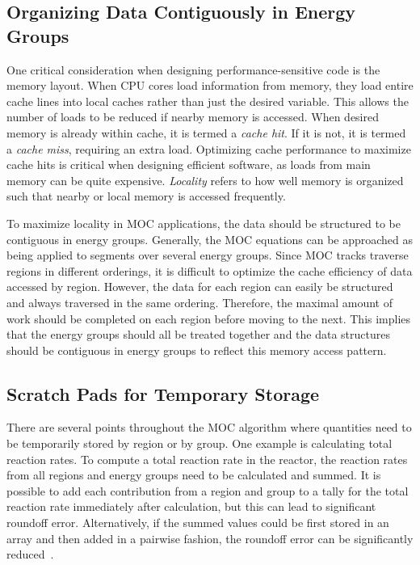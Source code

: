 \subsection{Organizing Data Contiguously in Energy Groups}

One critical consideration when designing performance-sensitive code is the memory layout. When CPU cores load information from memory, they load entire cache lines into local caches rather than just the desired variable. This allows the number of loads to be reduced if nearby memory is accessed. When desired memory is already within cache, it is termed a \textit{cache hit}. If it is not, it is termed a \textit{cache miss}, requiring an extra load. Optimizing cache performance to maximize cache hits is critical when designing efficient software, as loads from main memory can be quite expensive. \textit{Locality} refers to how well memory is organized such that nearby or local memory is accessed frequently. 

To maximize locality in \ac{MOC} applications, the data should be structured to be contiguous in energy groups. Generally, the \ac{MOC} equations can be approached as being applied to segments over several energy groups. Since \ac{MOC} tracks traverse regions in different orderings, it is difficult to optimize the cache efficiency of data accessed by region. However, the data for each region can easily be structured and always traversed in the same ordering. Therefore, the maximal amount of work should be completed on each region before moving to the next. This implies that the energy groups should all be treated together and the data structures should be contiguous in energy groups to reflect this memory access pattern. 

\subsection{Scratch Pads for Temporary Storage}

There are several points throughout the \ac{MOC} algorithm where quantities need to be temporarily stored by region or by group. One example is calculating total reaction rates. To compute a total reaction rate in the reactor, the reaction rates from all regions and energy groups need to be calculated and summed. It is possible to add each contribution from a region and group to a tally for the total reaction rate immediately after calculation, but this can lead to significant roundoff error. Alternatively, if the summed values could be first stored in an array and then added in a pairwise fashion, the roundoff error can be significantly reduced~\cite{pairwise}.

